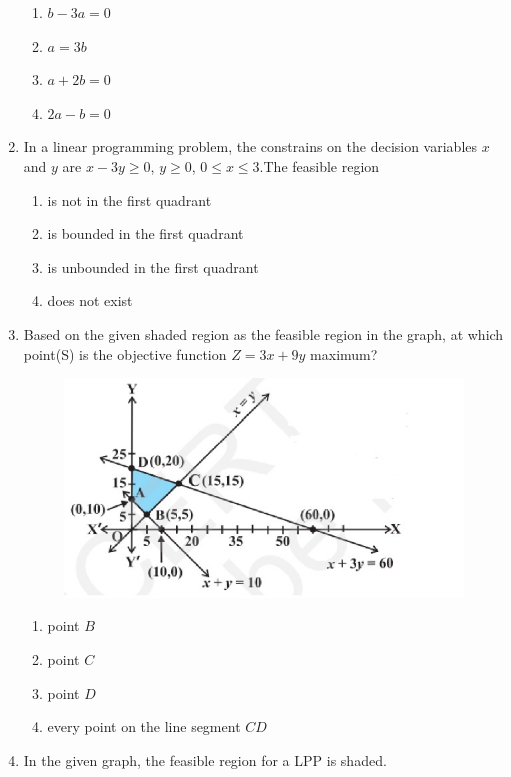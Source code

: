 \documentclass{article}
\begin{document}
\begin{enumerate}
\begin{enumerate}
    \item $b-3a=0$
    \item $a=3b$
    \item $a+2b=0$
    \item $2a-b=0$
\end{enumerate}
\item In a linear programming problem, the constrains on the decision variables $x$ and $y$ are $x-3y \geq 0$, $y \geq 0$, $0\leq x \leq 3$.The feasible region 
\begin{enumerate}
    \item is not in the first quadrant
    \item is bounded in the first quadrant 
    \item is unbounded in the first quadrant 
    \item does not exist  
\end{enumerate}
\item Based on the given shaded region as the feasible region in the graph, at which point(S) is the objective function $Z=3x+9y$ maximum?\\
\begin{figure}[h]
    \centering{}
    \includegraphics[width=\columnwidth]{Figs/Fig1.jpg}
    \caption{}
    \label{Fig1}
\end{figure}
\begin{enumerate}
    \item point $B$
    \item point $C$
    \item point $D$
    \item every point on the line segment $CD$   
\end{enumerate}
\item In the given graph, the feasible region for a LPP is shaded.\\

\end{enumerate}
\end{document}
